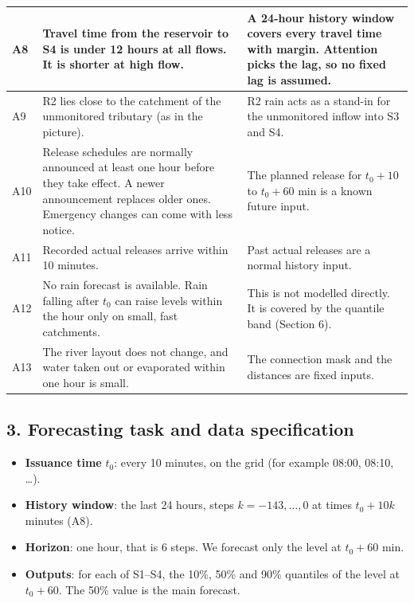 \documentclass[11pt,a4paper]{article}
\begin{document}
\begin{longtable}{|L{0.8cm}|L{7.5cm}|L{7.3cm}|}
A8 & Travel time from the reservoir to S4 is under 12 hours at all flows. It is shorter at high flow. & A 24-hour history window covers every travel time with margin. Attention picks the lag, so no fixed lag is assumed. \\ \hline
A9 & R2 lies close to the catchment of the unmonitored tributary (as in the picture). & R2 rain acts as a stand-in for the unmonitored inflow into S3 and S4. \\ \hline
A10 & Release schedules are normally announced at least one hour before they take effect. A newer announcement replaces older ones. Emergency changes can come with less notice. & The planned release for $t_0+10$ to $t_0+60$ min is a known future input. \\ \hline
A11 & Recorded actual releases arrive within 10 minutes. & Past actual releases are a normal history input. \\ \hline
A12 & No rain forecast is available. Rain falling after $t_0$ can raise levels within the hour only on small, fast catchments. & This is not modelled directly. It is covered by the quantile band (Section 6). \\ \hline
A13 & The river layout does not change, and water taken out or evaporated within one hour is small. & The connection mask and the distances are fixed inputs. \\ \hline
\end{longtable}

\subsection*{3. Forecasting task and data specification}

\begin{itemize}
  \item \textbf{Issuance time} $t_0$: every 10 minutes, on the grid (for example 08:00, 08:10, \dots).
  \item \textbf{History window}: the last 24 hours, steps $k=-143,\dots,0$ at times $t_0+10k$ minutes (A8).
  \item \textbf{Horizon}: one hour, that is 6 steps. We forecast only the level at $t_0+60$ min.
  \item \textbf{Outputs}: for each of S1--S4, the 10\%, 50\% and 90\% quantiles of the level at $t_0+60$. The 50\% value is the main forecast.
\end{itemize}
\end{document}
